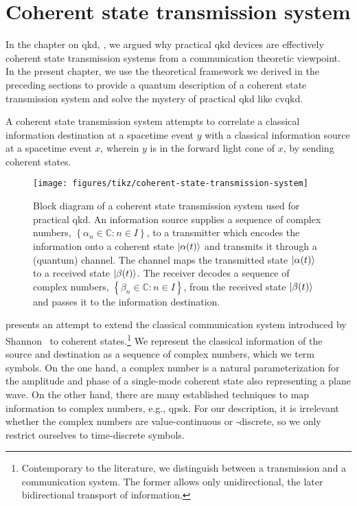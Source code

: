 \chapter{Coherent state transmission system}

In the chapter on \gls{qkd}, , we argued why practical \gls{qkd} devices are effectively coherent state transmission systems from a communication theoretic viewpoint.
In the present chapter, we use the theoretical framework we derived in the preceding sections to provide a quantum description of a coherent state transmission system and solve the mystery of practical \gls{qkd} like \gls{cvqkd}.

A coherent state transmission system attempts to correlate a classical information destination at a spacetime event $y$ with a classical information source at a spacetime event $x$, wherein $y$ is in the forward light cone of $x$, by sending coherent states.
\begin{figure}[htb]
	\centering
	\texttt{[image: figures/tikz/coherent-state-transmission-system]}
	\caption{Block diagram of a coherent state transmission system used for practical \gls{qkd}. An information source supplies a sequence of complex numbers, $\left\{\alpha_n\in\mathbb{C}\colon n\in I\right\}$, to a transmitter which encodes the information onto a coherent state $\lvert\alpha(t)\rangle$ and transmits it through a (quantum) channel. The channel maps the transmitted state $\lvert\alpha(t)\rangle$ to a received state $\lvert\beta(t)\rangle$. The receiver decodes a sequence of complex numbers, $\left\{\beta_n\in\mathbb{C}\colon n\in I\right\}$, from the received state $\lvert\beta(t)\rangle$ and passes it to the information destination.}\label{fig:coherent_state_transmission_system}
\end{figure}
 presents an attempt to extend the classical communication system introduced by Shannon~\cite{Shannon1948} to coherent states.\footnote{Contemporary to the literature, we distinguish between a transmission and a communication system. The former allows only unidirectional, the later bidirectional transport of information.}
We represent the classical information of the source and destination as a sequence of complex numbers, which we term symbols.
On the one hand, a complex number is a natural parameterization for the amplitude and phase of a single-mode coherent state also representing a plane wave.
On the other hand, there are many established techniques to map information to complex numbers, e.g., \gls{qpsk}.
For our description, it is irrelevant whether the complex numbers are value-continuous or -discrete, so we only restrict ourselves to time-discrete symbols.

